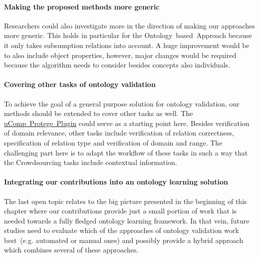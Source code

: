 \paragraph{Making the proposed methods more generic}
Researchers could also investigate more in the direction of making our approaches more generic. This holds in particular for the Ontology~based~Approach because it only takes subsumption relations into account. A huge improvement would be to also include object properties, however, major changes would be required because the algorithm needs to consider besides concepts also individuals. 

\paragraph{Covering other tasks of ontology validation}
To achieve the goal of a general purpose solution for ontology validation, our methods should be extended to cover other tasks as well.
The \hyperref[sec:ucomp_protege_plugin]{uComp~Protege~Plugin} could serve as a starting point here. Besides verification of domain relevance, other tasks include verification of relation correctness, specification of relation type and verification of domain and range. The challenging part here is to adapt the workflow of these tasks in such a way that the Crowdsourcing tasks include contextual information. 

\paragraph{Integrating our contributions into an ontology learning solution}
The last open topic relates to the big picture presented in the beginning of this chapter where our contributions provide just a small portion of work that is needed towards a fully fledged ontology learning framework. In that vein, future studies need to evaluate which of the approaches of ontology validation work best~(e.g. automated or manual ones) and possibly provide a hybrid approach which combines several of these approaches.
